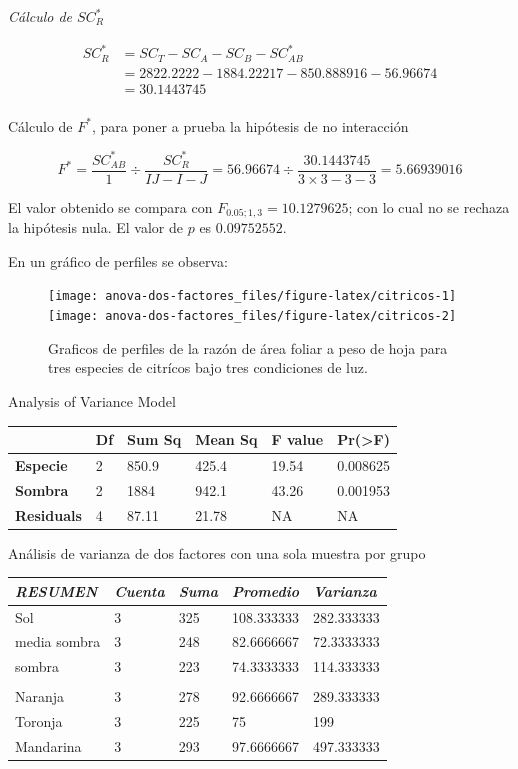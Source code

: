 \documentclass[]{book}
\theoremstyle{definition}
\theoremstyle{definition}
\theoremstyle{definition}
\theoremstyle{remark}
\begin{document}
\emph{Cálculo de \(SC_R^{*}\)}

\[
\begin{aligned}
SC_{R}^{*}& = SC_{T}-SC_{A}-SC_{B}-SC_{AB}^{*} \\
& = 2822.2222-1884.22217-850.888916-56.96674 \\
& = 30.1443745 \\
\end{aligned}
\]

Cálculo de \(F^{*}\), para poner a prueba la hipótesis de no interacción

\[
F^{*} = \frac{SC_{AB}^{*}}{1} \div \frac{SC_{R}^{*}}{IJ - I - J} = 56.96674 \div \frac{30.1443745}{3 \times 3 - 3 - 3} = 5.66939016
\]

El valor obtenido se compara con \(F_{0.05;1,3} = 10.1279625\); con lo
cual no se rechaza la hipótesis nula. El valor de \(p\) es
\(0.09752552\).

En un gráfico de perfiles se observa:




\begin{figure}
\texttt{[image: anova-dos-factores\_files/figure-latex/citricos-1]} \texttt{[image: anova-dos-factores\_files/figure-latex/citricos-2]} \caption{Graficos de perfiles de la razón de área foliar a peso de
hoja para tres especies de citrícos bajo tres condiciones de luz.}\label{fig:citricos}
\end{figure}

Analysis of Variance Model

\begin{longtable}[]{@{}llllll@{}}
\toprule
& Df & Sum Sq & Mean Sq & F value & Pr(\textgreater{}F)\tabularnewline
\midrule
\endhead
\textbf{Especie} & 2 & 850.9 & 425.4 & 19.54 & 0.008625\tabularnewline
\textbf{Sombra} & 2 & 1884 & 942.1 & 43.26 & 0.001953\tabularnewline
\textbf{Residuals} & 4 & 87.11 & 21.78 & NA & NA\tabularnewline
\bottomrule
\end{longtable}

Análisis de varianza de dos factores con una sola muestra por grupo

\begin{longtable}[]{@{}lllll@{}}
\toprule
\emph{RESUMEN} & \emph{Cuenta} & \emph{Suma} & \emph{Promedio} &
\emph{Varianza}\tabularnewline
\midrule
\endhead
Sol & 3 & 325 & 108.333333 & 282.333333\tabularnewline
media sombra & 3 & 248 & 82.6666667 & 72.3333333\tabularnewline
sombra & 3 & 223 & 74.3333333 & 114.333333\tabularnewline
& & & &\tabularnewline
Naranja & 3 & 278 & 92.6666667 & 289.333333\tabularnewline
Toronja & 3 & 225 & 75 & 199\tabularnewline
Mandarina & 3 & 293 & 97.6666667 & 497.333333\tabularnewline
\bottomrule
\end{longtable}
\end{document}
